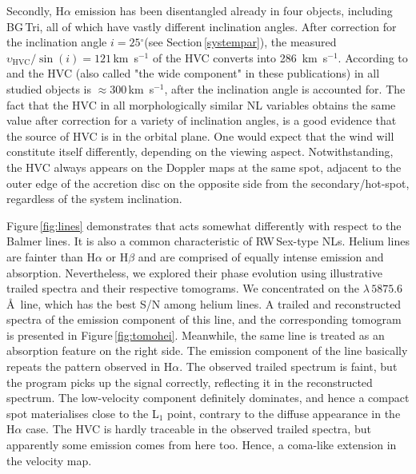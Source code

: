 \documentclass[fleqn,usenatbib]{mnras}
\def\bg{BG\,Tri}
\def\grad{$^\circ$}
\begin{document}
Secondly,  H$\alpha$ emission has been disentangled already in four objects, including \bg,  all of which have vastly different inclination
angles. After correction for the inclination angle $i=25$\grad (see Section\,\ref{systempar}),  the measured $\upsilon_{\mathrm{HVC}}/
\sin(i)=121$\,km~s$^{-1}$ of the HVC  converts into  286~km~s$^{-1}$. According to \citet{2017MNRAS.470.1960H} and \citet{Subebekova20} the
HVC  (also called "the wide component" in these publications) in all studied objects is $\approx300$\,km~s$^{-1}$, after the inclination angle
is accounted for. 
The fact that the HVC in all morphologically similar NL variables obtains the same value  after correction for a variety of inclination
angles, is a good evidence that the source of HVC is in the orbital plane. 
One would expect that the wind will constitute itself  differently, depending on the viewing aspect.  Notwithstanding, the HVC always appears on the
Doppler maps at the same spot, adjacent to the outer edge of the accretion disc on the opposite side from the secondary/hot-spot,
regardless of the system inclination. 

Figure\,\ref{fig:lines} demonstrates that  acts somewhat differently with respect to the Balmer lines. It is also a common
characteristic of RW\,Sex-type NLs. 
Helium lines are  fainter than H$\alpha$ or H$\beta$ and are comprised of equally intense emission and absorption. Nevertheless, we explored
their phase evolution using illustrative trailed spectra and their respective tomograms. We concentrated on the 
$\lambda\,5875.6$\,\AA\ line, which has the best S/N among helium lines. A trailed and reconstructed spectra of the emission component of this  line,  and the corresponding tomogram
is presented in %
Figure\,\ref{fig:tomohei}. Meanwhile, the same line is treated as an absorption feature  on the right side.
The emission component of the line basically repeats the pattern observed in H$\alpha$. The observed trailed spectrum is faint, but the
program picks up the signal correctly, reflecting it in the reconstructed spectrum. The low-velocity component definitely dominates, and hence
a compact spot materialises  close to the L$_1$ point, contrary to the diffuse appearance in the  H$\alpha$ case. The HVC is hardly traceable
in the observed trailed spectra, but apparently some emission comes from here too. Hence, a coma-like extension in the velocity map. 
%
\end{document}
